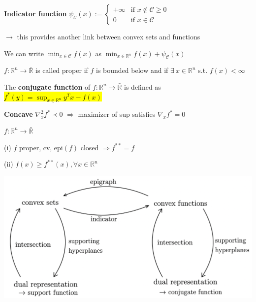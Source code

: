 \textbf{Indicator function}
$\psi_\mathcal{C}(x) := \begin{cases} +\infty &\text{if } x \notin\mathcal{C} \ge 0 \\ 0 &\text{if } x \in\mathcal{C} \end{cases}$

$\rightarrow$ this provides another link between convex sets and functions

We can write
$\min_{x \in \mathcal{C}}f(x)$ as
$\min_{x \in \mathbb{R}^{n}}f(x) + \psi_\mathcal{C}(x)$

\begin{definition}[3]
	$f: \mathbb{R}^{n}\rightarrow\bar{\mathbb{R}}$ is called proper
	if $f$ is bounded below and
	if $\exists\ x \in \mathbb{R}^{n}$ s.t. $f(x)<\infty$
\end{definition}

\begin{definition}
	The \textbf{conjugate function} of $f: \mathbb{R}^{n}\rightarrow\bar{\mathbb{R}}$  is defined as
	\textcolor{hltext}{\hl{ $f^*(y)=\sup_{x \in \mathbb{R}^{n}}y^T x-f(x)$ }}
\end{definition}

\textbf{Concave}
$\nabla_x^2 f^* \prec0$
$\Rightarrow$
maximizer of sup satisfies
$\nabla_x f^* = 0$

\begin{theorem}
	$f:\mathbb{R}^{n}\rightarrow\bar{\mathbb{R}}$

	(i) $f$ proper, cv, epi$(f)$ closed
	$\Rightarrow f^{**}=f$

	(ii) $f(x)\ge f^{**}(x), \forall x\in\mathbb{R}^{n}$
\end{theorem}

\includegraphics[width=\columnwidth]{images/summary_set_functions.png}
